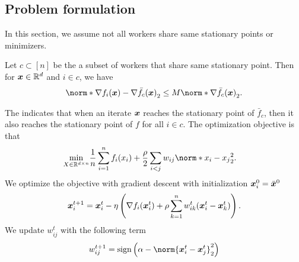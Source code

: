 \documentclass{article}
\begin{document}
\subsection{Problem formulation}
In this section, we assume not all workers share same stationary points or minimizers. 
\begin{assumption}\label{a:strong-growth}
  Let $c\subset[n]$ be the a subset of workers that share same stationary point. Then for $\bm{x}\in\mathbb{R}^d$ and $i\in c$, we have
  \begin{align*}
    \norm*{\nabla f_i(\xx) - \nabla \bar{f}_c(\xx)}_2 \le M \norm*{\nabla \bar{f}_c(\xx)}_2.
  \end{align*}
\end{assumption}
The  indicates that when an iterate $\bm{x}$ reaches the stationary point of $\bar{f}_c$, then it also reaches the stationary point of $f$ for all $i\in c$. The optimization objective is that
\begin{align*}
  \min_{X\in\mathbb{R}^{d\times n}}&  \frac{1}{n} \sum_{i=1}^n f_i(x_i) + \frac{\rho}{2} \sum_{i<j} w_{ij}\norm*{x_{i} - x_{j}}_2^2.
\end{align*}
We optimize the objective with gradient descent with initialization $\bm{x}_i^0=\bar{\bm{x}}^0$
\begin{equation}\label{eq:x:gd}
    \bm{x}_i^{t+1}=\bm{x}_i^t - \eta \left(
      \nabla f_i(\bm{x}^t_i) + \rho \sum_{k=1}^n w^t_{ik}(\bm{x}^t_i - \bm{x}^t_k)
    \right).
\end{equation}
We update $w_{ij}^t$ with the following term
\begin{align*}
  w_{ij}^{t+1} = \text{sign}\left(\alpha - \norm{\xx^t_i - \xx^t_j}_2^2 \right)
\end{align*}
\end{document}
